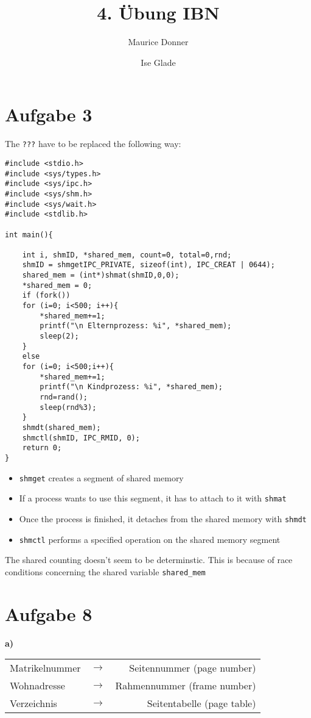\documentclass{article}
\title{\textsf{\color{blue!40!black}4. Übung IBN}}
\author{Maurice Donner \and Ise Glade}
\begin{document}
\maketitle

\section*{Aufgabe 3}
The \texttt{???} have to be replaced the following way:
\begin{lstlisting}
#include <stdio.h>
#include <sys/types.h>
#include <sys/ipc.h>
#include <sys/shm.h>
#include <sys/wait.h>
#include <stdlib.h>

int main(){

    int i, shmID, *shared_mem, count=0, total=0,rnd;
    shmID = shmgetIPC_PRIVATE, sizeof(int), IPC_CREAT | 0644);
    shared_mem = (int*)shmat(shmID,0,0);
    *shared_mem = 0;
    if (fork())
	for (i=0; i<500; i++){
	    *shared_mem+=1;
	    printf("\n Elternprozess: %i", *shared_mem);
	    sleep(2);
	}
    else
	for (i=0; i<500;i++){
	    *shared_mem+=1;
	    printf("\n Kindprozess: %i", *shared_mem);
	    rnd=rand();
	    sleep(rnd%3);
	}
    shmdt(shared_mem);
    shmctl(shmID, IPC_RMID, 0);
    return 0;
}
\end{lstlisting}

\begin{itemize}
    \item \texttt{shmget} creates a segment of shared memory
    \item If a process wants to use this segment, it has to attach to it with
	\texttt{shmat}
    \item Once the process is finished, it detaches from the shared memory with
	\texttt{shmdt}
    \item \texttt{shmctl} performs a specified operation on the shared memory segment
\end{itemize}

The shared counting doesn't seem to be determinstic. This is because of race conditions
concerning the shared variable \texttt{shared\_mem}

\section*{Aufgabe 8}
\textbf{a)} 
\begin{table}[H]
    \centering
    \begin{tabular}{lcr}
	\centering
	Matrikelnummer & $\rightarrow$ & Seitennummer (page number)\\
	Wohnadresse & $\rightarrow$ & Rahmennummer (frame number)\\
	Verzeichnis & $\rightarrow$ & Seitentabelle (page table)\\
    \end{tabular}
\end{table}
\end{document}
